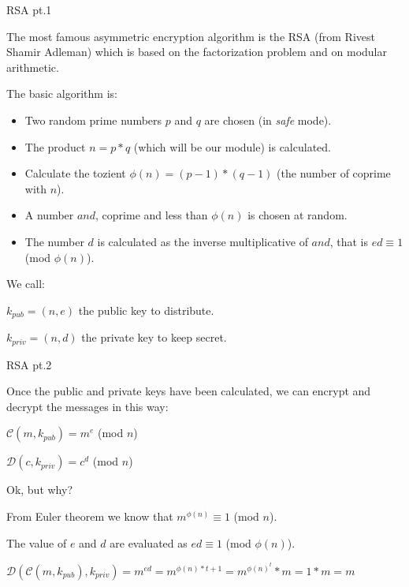\documentclass[handout, xcolor=dvipsnames,aspectratio=169]{beamer}
\begin{document}
\begin{frame}{RSA pt.1}

  \pause

  The most famous asymmetric encryption algorithm is the RSA (from {\color{red} R}ivest {\color{red}S}hamir {\color{red}A}dleman) which is based on the factorization problem and on modular arithmetic.

  \pause

  \smallskip

  The basic algorithm is:\pause

  \begin{itemize}
    \item Two random prime numbers $p$ and $q$ are chosen (in \textit {safe} mode). \pause
    \item The product $n = p * q$ (which will be our module) is calculated. \pause
    \item Calculate the tozient $\phi(n) = (p-1) * (q-1)$ (the number of coprime with $n$). \pause
    \item A number $and$, coprime and less than $\phi(n)$ is chosen at random. \pause
    \item The number $d$ is calculated as the inverse multiplicative of $and$, that is $ed \equiv 1$ (mod $\phi(n)$).
  \end{itemize}
  
  \medskip

  \pause

  We call:

  \pause

  $k_{pub} = (n, e)$ the public key to distribute.

  \pause

  $k_{priv} = (n, d)$ the private key to keep secret.

\end{frame}

\begin{frame}{RSA pt.2}


  Once the public and private keys have been calculated, we can encrypt and decrypt the messages in this way:
  
  
  \pause
  \medskip

  $\mathcal{C}(m, k_{pub}) = m^{e} $ (mod $n$) \pause

  $\mathcal{D}(c, k_{priv}) = c^{d} $ (mod $n$)

  \medskip

  \pause

  Ok, but why?

  \medskip

  \pause

  From Euler theorem we know that $m^{\phi(n)} \equiv 1 $ (mod $n$).

  The value of $e$ and $d$ are evaluated as $ed \equiv 1$ (mod $\phi(n)$).

  \medskip

  $\mathcal{D}(\mathcal{C}(m, k_{pub}), k_{priv}) = m^{ed} = m^{\phi(n)*t + 1} = m^{\phi(n)^{t}} * m = 1 * m = m$

\end{frame}
\end{document}
